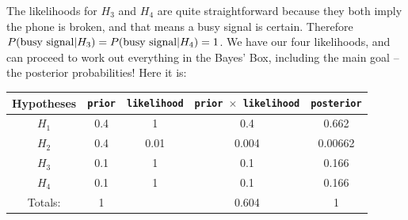 The likelihoods for $H_3$ and $H_4$ are quite straightforward
because they both imply the phone is broken, and that means a busy signal is certain.
Therefore $P(\textnormal{busy signal} | H_3) = P(\textnormal{busy signal} | H_4) = 1$.
We have our four likelihoods, and can proceed to work out everything in the
Bayes' Box, including the main goal -- the posterior probabilities! Here it is:
\begin{table}[h!]
\begin{center}
\begin{tabular}{|c|c|c|c|c|}
\hline
{\bf Hypotheses} & {\tt prior} & {\tt likelihood} &
{\tt prior $\times$ likelihood} & {\tt posterior}\\
\hline
$H_1$ & 0.4 & 1 &  0.4 & 0.662\\
$H_2$ & 0.4 & 0.01 & 0.004 & 0.00662\\
$H_3$ & 0.1 & 1 & 0.1 & 0.166\\
$H_4$ & 0.1 & 1 & 0.1 & 0.166\\
\hline
Totals: & 1 & & 0.604 & 1\\
\hline
\end{tabular}
\end{center}
\end{table}

